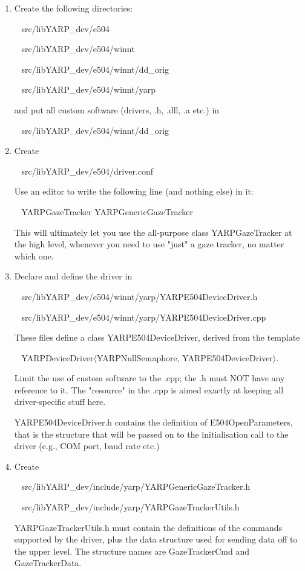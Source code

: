 \begin{enumerate}

  \item Create the following directories:

	~	src/libYARP\_dev/e504

	~	src/libYARP\_dev/e504/winnt

	~	src/libYARP\_dev/e504/winnt/dd\_orig

	~	src/libYARP\_dev/e504/winnt/yarp

	and put all custom software (drivers, .h, .dll, .a etc.) in

	~	src/libYARP\_dev/e504/winnt/dd\_orig

  \item Create

	~	src/libYARP\_dev/e504/driver.conf

	Use an editor to write the following line (and nothing else) in it:

	~	YARPGazeTracker YARPGenericGazeTracker

	This will ultimately let you use the all-purpose class YARPGazeTracker
	at the high level, whenever you need to use "just" a gaze tracker,
	no matter which one.

  \item Declare and define the driver in

	~	src/libYARP\_dev/e504/winnt/yarp/YARPE504DeviceDriver.h

	~	src/libYARP\_dev/e504/winnt/yarp/YARPE504DeviceDriver.cpp

	These files define a class YARPE504DeviceDriver, derived from the
	template

        ~ YARPDeviceDriver$\langle$YARPNullSemaphore, YARPE504DeviceDriver$\rangle$.

	Limit the use of custom software to the .cpp; the .h must NOT have any
	reference to it. The "resource" in the .cpp is aimed exactly at keeping
	all driver-specific stuff here.

	YARPE504DeviceDriver.h contains the definition of E504OpenParameters,
	that is the structure that will be passed on to the initialisation call
	to the driver (e.g., COM port, baud rate etc.)

  \item Create

	~	src/libYARP\_dev/include/yarp/YARPGenericGazeTracker.h

	~	src/libYARP\_dev/include/yarp/YARPGazeTrackerUtils.h

	YARPGazeTrackerUtils.h must contain the definitions of the commands
	supported by the driver, plus the data structure used for sending
	data off to the upper level. The structure names are GazeTrackerCmd
	and GazeTrackerData.


\end{enumerate}
